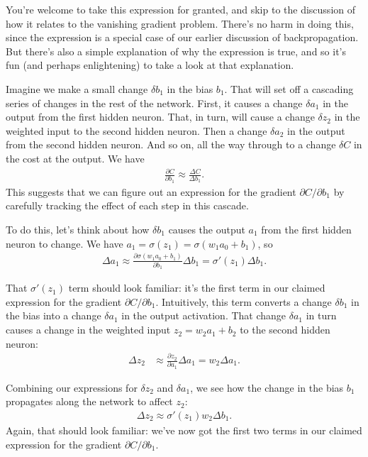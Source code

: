 \documentclass[a4paper,twoside,10pt]{book}
\begin{document}
You're welcome to take this expression for granted, and skip to the discussion of how it relates to the vanishing gradient problem. There's no harm in doing this, since the expression is a special case of our earlier discussion of backpropagation. But there's also a simple explanation of why the expression is true, and so it's fun (and perhaps enlightening) to take a look at that explanation.

Imagine we make a small change $\delta b_1$ in the bias $b_1$. That will set off a cascading series of changes in the rest of the network. First, it causes a change $\delta a_1$ in the output from the first hidden neuron. That, in turn, will cause a change $\delta z_2$ in the weighted input to the second hidden neuron. Then a change $\delta a_2$ in the output from the second hidden neuron. And so on, all the way through to a change $\delta C$ in the cost at the output. We have
\begin{eqnarray}
\frac{\partial C}{\partial b_1} \approx \frac{\Delta C}{\Delta b_1}.\label{eq:114}
\end{eqnarray}
This suggests that we can figure out an expression for the gradient $\partial C/\partial b_1$ by carefully tracking the effect of each step in this cascade.


To do this, let's think about how $\delta b_1$ causes the output $a_1$ from the first hidden neuron to change. We have $a_1=\sigma(z_1)=\sigma(w_1a_0+b_1)$, so
\begin{eqnarray}
\Delta a_1 \approx \frac{\partial \sigma(w_1 a_0+b_1)}{\partial b_1} \Delta b_1 = \sigma'(z_1) \Delta b_1. \label{eq:116}
\end{eqnarray}

That $\sigma'(z_1)$ term should look familiar: it's the first term in our claimed expression for the gradient $\partial C/\partial b_1$. Intuitively, this term converts a change $\delta b_1$ in the bias into a change $\delta a_1$ in the output activation. That change $\delta a_1$ in turn causes a change in the weighted input $z_2=w_2a_1+b_2$ to the second hidden neuron:
\begin{eqnarray}
\Delta z_2 & \approx \frac{\partial z_2}{\partial a_1} \Delta a_1 =  w_2 \Delta a_1. \label{eq:118}
\end{eqnarray}

Combining our expressions for $\delta z_2$ and $\delta a_1$, we see how the change in the bias $b_1$ propagates along the network to affect $z_2$:
\begin{eqnarray}
\Delta z_2 \approx \sigma'(z_1) w_2 \Delta b_1.\label{eq:119}
\end{eqnarray}
Again, that should look familiar: we've now got the first two terms in our claimed expression for the gradient $\partial C/\partial b_1$.
\end{document}
